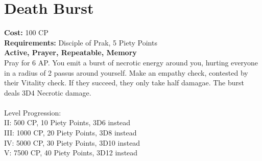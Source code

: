 \section{Death Burst}
\textbf{Cost:} 100 CP\\
\textbf{Requirements:} Disciple of Prak, 5 Piety Points \\
\textbf{Active, Prayer, Repeatable, Memory}\\
Pray for 6 AP. You emit a burst of necrotic energy around you, hurting everyone in a radius of 2 passus around yourself. Make an empathy check, contested by their Vitality check. If they succeed, they only take half damagae. The burst deals 3D4 Necrotic damage.\\
\\
Level Progression:\\
II: 500 CP, 10 Piety Points, 3D6 instead\\
III: 1000 CP, 20 Piety Points, 3D8 instead\\
IV: 5000 CP, 30 Piety Points, 3D10 instead\\
V: 7500 CP, 40 Piety Points, 3D12 instead\\